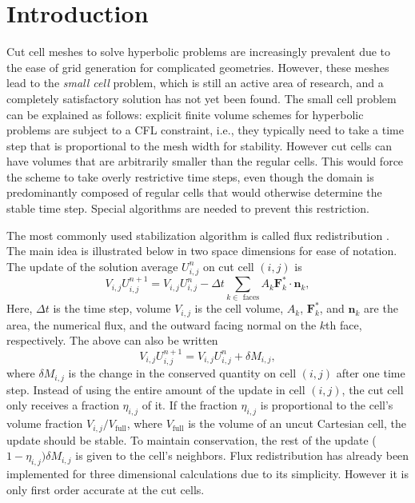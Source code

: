 \section{Introduction}\label{sec:intro}
Cut cell meshes to solve hyperbolic problems 
are increasingly prevalent due to the ease 
of grid generation for complicated geometries. 
However, these meshes lead to the {\em small cell} problem, which
is still an active area of research, and  
a completely satisfactory solution has not yet been found.
The small cell problem can be explained as follows: explicit
finite volume schemes for hyperbolic problems are subject to a CFL constraint, i.e.,  they typically need to take a time step that is proportional to the mesh width for
stability. However cut cells can have volumes that are arbitrarily smaller than the regular cells.  This would force the scheme to take overly restrictive time steps, even though the domain is predominantly composed of regular cells that would otherwise determine the stable time step. Special algorithms are needed to prevent this restriction.

The most commonly used stabilization algorithm is called flux
redistribution \cite{chern:colella,vof:colella}. The main idea is illustrated below in two space
dimensions for ease of notation.
The update of the solution average 
$U^n_{i,j}$ on cut cell $(i,j)$  is
\begin{equation*}
V_{i,j} U_{i,j} ^{n+1}  = V_{i,j} U_{i,j}^n  -  \Delta t \sum_{k \in \text{ faces}}A_k \mathbf{F}_k^* \cdot \mathbf{n}_k,
\end{equation*}
Here, $\Delta t$ is the time step,
volume $V_{i,j}$ is the cell volume,
$A_k$, $\mathbf{F}_k^*$, and $\mathbf{n}_k$ are the area, the numerical flux, and the outward facing normal on the $k$th face, respectively.
The above can also be written
\begin{equation*}
V_{i,j} U_{i,j} ^{n+1} = V_{i,j} U_{i,j}^n  +  \delta  M_{i,j} ,
\end{equation*}
where $\delta M_{i,j}$ is the change in the conserved quantity 
on cell $(i,j)$ after one time step.
Instead of using the entire amount of the update in cell $(i,j)$, 
the cut cell only receives a fraction $\eta_{i,j}$ of it.  If the fraction $\eta_{i,j}$
is proportional to the cell's volume fraction $V_{i,j}/V_{\text{full}}$,
where $V_{\text{full}}$ is the volume of an uncut Cartesian cell, the update should be stable. 
To maintain conservation, the rest of the update ($1-\eta_{i,j})\delta M_{i,j}$
is given to the cell's neighbors.  
Flux redistribution has already been implemented for three dimensional
calculations due to its simplicity. However it is only first order accurate at the cut cells.

